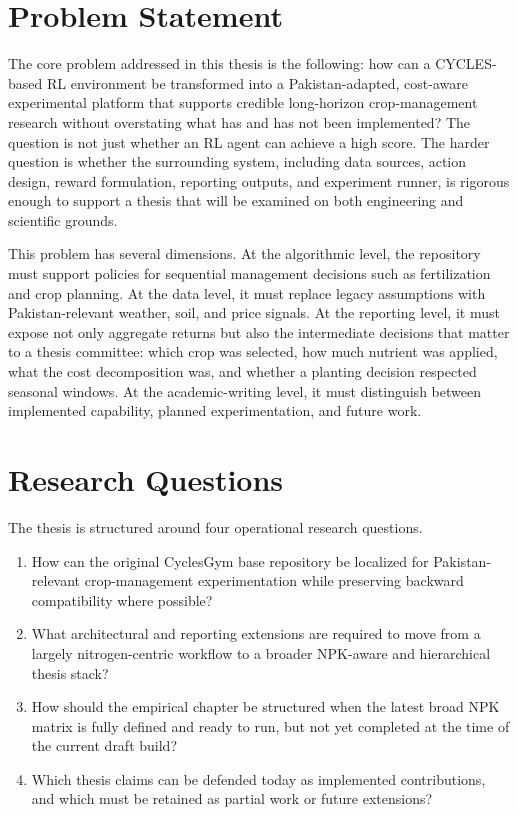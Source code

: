 \section{Problem Statement}

The core problem addressed in this thesis is the following: how can a CYCLES-based RL environment be transformed into a Pakistan-adapted, cost-aware experimental platform that supports credible long-horizon crop-management research without overstating what has and has not been implemented? The question is not just whether an RL agent can achieve a high score. The harder question is whether the surrounding system, including data sources, action design, reward formulation, reporting outputs, and experiment runner, is rigorous enough to support a thesis that will be examined on both engineering and scientific grounds.

This problem has several dimensions. At the algorithmic level, the repository must support policies for sequential management decisions such as fertilization and crop planning. At the data level, it must replace legacy assumptions with Pakistan-relevant weather, soil, and price signals. At the reporting level, it must expose not only aggregate returns but also the intermediate decisions that matter to a thesis committee: which crop was selected, how much nutrient was applied, what the cost decomposition was, and whether a planting decision respected seasonal windows. At the academic-writing level, it must distinguish between implemented capability, planned experimentation, and future work.

\section{Research Questions}

The thesis is structured around four operational research questions.

\begin{enumerate}[leftmargin=1.2cm]
    \item How can the original CyclesGym base repository be localized for Pakistan-relevant crop-management experimentation while preserving backward compatibility where possible?
    \item What architectural and reporting extensions are required to move from a largely nitrogen-centric workflow to a broader NPK-aware and hierarchical thesis stack?
    \item How should the empirical chapter be structured when the latest broad NPK matrix is fully defined and ready to run, but not yet completed at the time of the current draft build?
    \item Which thesis claims can be defended today as implemented contributions, and which must be retained as partial work or future extensions?
\end{enumerate}

